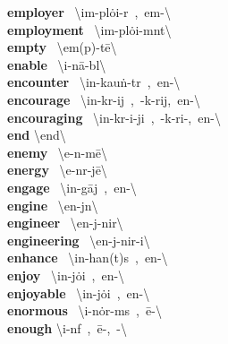 \documentclass[10pt,a4paper]{article}
\begin{document}
\begin{multicols}{2}
\textbf{ employer }\quad \ \textbackslash im-\textprimstress pl\.{o}i-\textschwa r\ ,\ em-\textbackslash \\
\textbf{ employment }\quad \ \textbackslash im-\textprimstress pl\.{o}i-m\textschwa nt\textbackslash \\
\textbf{ empty }\quad \ \textbackslash \textprimstress em(p)-t\={e}\textbackslash \\
\textbf{ enable }\quad \ \textbackslash i-\textprimstress n\={a}-b\textschwa l\textbackslash \\
\textbf{ encounter }\quad \ \textbackslash in-\textprimstress kau\. n-t\textschwa r\ ,\ en-\textbackslash \\
\textbf{ encourage }\quad \ \textbackslash in-\textprimstress k\textschwa r-ij\ ,\ -\textprimstress k\textschwa -rij,\ en-\textbackslash \\
\textbf{ encouraging }\quad \ \textbackslash in-\textprimstress k\textschwa r-i-ji\engma \ ,\ -\textprimstress k\textschwa -ri-,\ en-\textbackslash \\
\textbf{ end }\quad \textbackslash \textprimstress end\textbackslash \\
\textbf{ enemy }\quad \ \textbackslash \textprimstress e-n\textschwa -m\={e}\textbackslash \\
\textbf{ energy }\quad \ \textbackslash \textprimstress e-n\textschwa r-j\={e}\textbackslash \\
\textbf{ engage }\quad \ \textbackslash in-\textprimstress g\={a}j\ ,\ en-\textbackslash \\
\textbf{ engine }\quad \ \textbackslash \textprimstress en-j\textschwa n\textbackslash \\
\textbf{ engineer }\quad \ \textbackslash \textsecstress en-j\textschwa -\textprimstress nir\textbackslash \\
\textbf{ engineering }\quad \ \textbackslash \textsecstress en-j\textschwa -\textprimstress nir-i\engma \textbackslash \\
\textbf{ enhance }\quad \ \textbackslash in-\textprimstress han(t)s\ ,\ en-\textbackslash \\
\textbf{ enjoy }\quad \ \textbackslash in-\textprimstress j\.{o}i\ ,\ en-\textbackslash \\
\textbf{ enjoyable }\quad \ \textbackslash in-\textprimstress j\.{o}i\ ,\ en-\textbackslash \\
\textbf{ enormous }\quad \ \textbackslash i-\textprimstress n\.{o}r-m\textschwa s\ ,\ \={e}-\textbackslash \\
\textbf{ enough }\quad \textbackslash i-\textprimstress n\textschwa f\ ,\ \={e}-,\ \textschwa -\textbackslash \\

\end{multicols}
\end{document}
